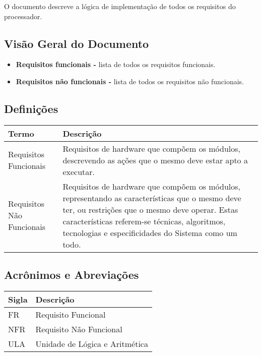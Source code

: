 \documentclass{report}
\begin{document}
  O documento descreve a lógica de implementação de todos os requisitos do processador.

\subsection{Visão Geral do Documento}
  \begin{itemize}
   \item \textbf{Requisitos funcionais -} lista de todos os requisitos funcionais.
   \item \textbf{Requisitos não funcionais -} lista de todos os requisitos não funcionais.
  \end{itemize}

  \subsection{Definições}
    \FloatBarrier
    \begin{table}[H]
      \begin{center}
        \begin{tabular}[pos]{|m{5cm} | m{9cm}|} 
          \hline
          \cellcolor[gray]{0.9}\textbf{Termo} & \cellcolor[gray]{0.9}\textbf{Descrição} \\ \hline
          Requisitos Funcionais & Requisitos de hardware que compõem os módulos, descrevendo as ações que o mesmo deve estar apto a executar.   \\ \hline
          Requisitos Não Funcionais & Requisitos de hardware que compõem os módulos, representando as características que o mesmo deve ter, ou restrições que o mesmo deve operar. Estas características referem-se técnicas, algoritmos, tecnologias e especificidades do Sistema como um todo.  \\ \hline
        \end{tabular}
      \end{center}
    \end{table}  

  \subsection{Acrônimos e Abreviações}
    \FloatBarrier
    \begin{table}[H]
      \begin{center}
        \begin{tabular}[pos]{|m{2cm} | m{12cm}|} 
          \hline
          \cellcolor[gray]{0.9}\textbf{Sigla} & \cellcolor[gray]{0.9}\textbf{Descrição} \\ \hline
          FR      & Requisito Funcional  \\ \hline
          NFR     & Requisito Não Funcional  \\ \hline
          ULA     & Unidade de Lógica e Aritmética  \\ \hline
        \end{tabular}
      \end{center}
    \end{table}  
\end{document}
